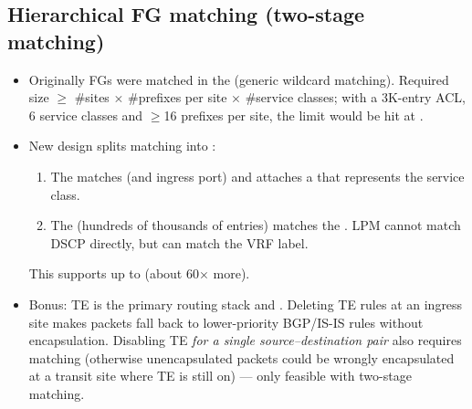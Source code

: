 \subsection{Hierarchical FG matching (two-stage matching)}
\begin{itemize}
\item Originally FGs were matched in the  (generic wildcard matching). Required size $\ge$ \#sites $\times$ \#prefixes per site $\times$ \#service classes; with a 3K-entry ACL, 6 service classes and $\ge$16 prefixes per site, the limit would be hit at .
\item New design splits matching into :
\begin{enumerate}
\item The  matches  (and ingress port) and attaches a  that represents the service class.
\item The  (hundreds of thousands of entries) matches the . LPM cannot match DSCP directly, but can match the VRF label.
\end{enumerate}
This supports up to  (about 60$\times$ more).
\item Bonus: TE is the primary routing stack and . Deleting TE rules at an ingress site makes packets fall back to lower-priority BGP/IS-IS rules without encapsulation. Disabling TE \emph{for a single source--destination pair} also requires matching  (otherwise unencapsulated packets could be wrongly encapsulated at a transit site where TE is still on) --- only feasible with two-stage matching.
\end{itemize}

